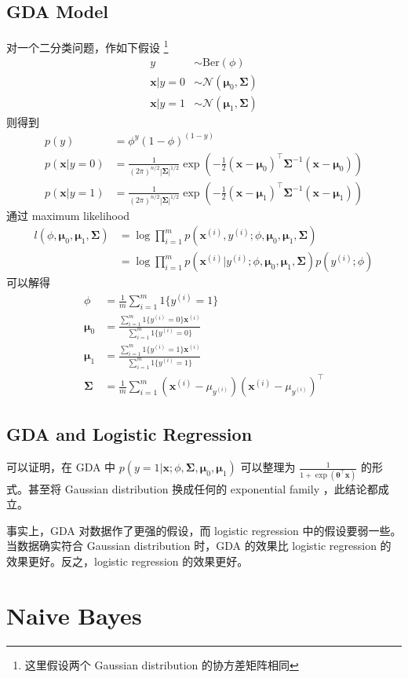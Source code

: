 		\subsection{GDA Model} 
			对一个二分类问题，作如下假设
			\footnote{这里假设两个 Gaussian distribution 的协方差矩阵相同}
			\begin{align*}
				y &\sim \text{Ber}(\phi) \\
				\bm{x} | y=0 &\sim \mathcal{N} (\bm{\mu}_0, \bm{\Sigma}) \\
				\bm{x} | y=1 &\sim \mathcal{N} (\bm{\mu}_1, \bm{\Sigma})
			\end{align*}
			则得到 
			\begin{align*}
				p(y) &= \phi^y (1-\phi)^{(1-y)} \\
				p(\bm{x} | y=0) &= \frac{1}{(2\pi)^{n/2} |\bm{\Sigma}|^{1/2}} \exp \left( -\frac{1}{2} (\bm{x}-\bm{\mu}_0)^\intercal \bm{\Sigma}^{-1} (\bm{x}-\bm{\mu}_0) \right) \\
				p(\bm{x} | y=1) &= \frac{1}{(2\pi)^{n/2} |\bm{\Sigma}|^{1/2}} \exp \left( -\frac{1}{2} (\bm{x}-\bm{\mu}_1)^\intercal \bm{\Sigma}^{-1} (\bm{x}-\bm{\mu}_1) \right)
			\end{align*}
			通过 maximum likelihood 
			\begin{align*}
				l(\phi, \bm{\mu}_0, \bm{\mu}_1, \bm\Sigma) &= \log \prod_{i=1}^{m} p(\bm x^{(i)}, y^{(i)}; \phi, \bm{\mu}_0, \bm{\mu}_1, \bm{\Sigma}) \\
				&= \log \prod_{i=1}^{m} p(\bm x^{(i)} | y^{(i)}; \phi, \bm{\mu}_0, \bm{\mu}_1, \bm{\Sigma}) p(y^{(i)}; \phi)
			\end{align*}
			可以解得 
			\begin{align*}
				\phi &= \frac{1}{m} \sum_{i=1}^{m} 1\{y^{(i)}=1\} \\
				\bm{\mu}_0 &= \frac{ \sum_{i=1}^{m} 1\{y^{(i)}=0\} \bm{x}^{(i)}} { \sum_{i=1}^{m} 1\{y^{(i)}=0\} } \\
				\bm{\mu}_1 &= \frac{ \sum_{i=1}^{m} 1\{y^{(i)}=1\} \bm{x}^{(i)}} { \sum_{i=1}^{m} 1\{y^{(i)}=1\} } \\
				\bm{\Sigma} &= \frac{1}{m} \sum_{i=1}^{m} \left( \bm{x}^{(i)} - \mu_{y^{(i)}} \right) \left( \bm{x}^{(i)} - \mu_{y^{(i)}} \right)^\intercal
			\end{align*}
			
		\subsection{GDA and Logistic Regression}
			可以证明，在 GDA 中 $ p(y=1 | \bm{x}; \phi, \bm{\Sigma}, \bm{\mu}_0, \bm{\mu}_1) $ 可以整理为 $ \frac{1}{1+\exp(\bm{\theta}^\intercal \bm{x})} $ 的形式。甚至将 Gaussian distribution 换成任何的 exponential family ，此结论都成立。
			
			事实上，GDA 对数据作了更强的假设，而 logistic regression 中的假设要弱一些。当数据确实符合 Gaussian distribution 时，GDA 的效果比 logistic 
			regression 的效果更好。反之，logistic regression 的效果更好。
			
	\section{Naive Bayes} 
		